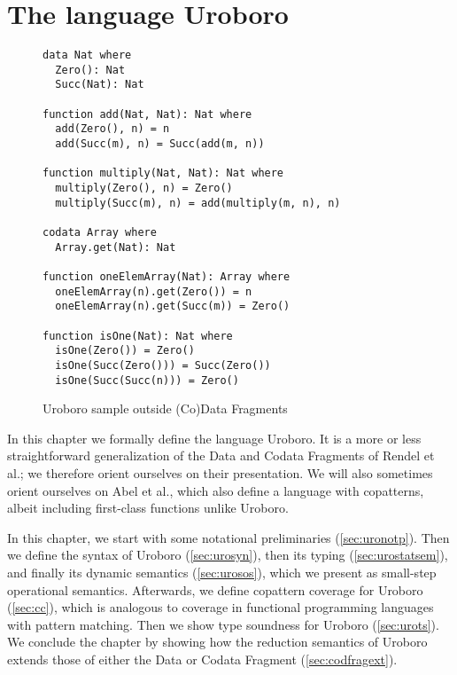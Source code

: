 \chapter{The language Uroboro}
\label{ch:uro}

\begin{figure}
\begin{lstlisting}
data Nat where
  Zero(): Nat
  Succ(Nat): Nat

function add(Nat, Nat): Nat where
  add(Zero(), n) = n
  add(Succ(m), n) = Succ(add(m, n))

function multiply(Nat, Nat): Nat where
  multiply(Zero(), n) = Zero()
  multiply(Succ(m), n) = add(multiply(m, n), n)

codata Array where
  Array.get(Nat): Nat

function oneElemArray(Nat): Array where
  oneElemArray(n).get(Zero()) = n
  oneElemArray(n).get(Succ(m)) = Zero()

function isOne(Nat): Nat where
  isOne(Zero()) = Zero()
  isOne(Succ(Zero())) = Succ(Zero())
  isOne(Succ(Succ(n))) = Zero()
\end{lstlisting}
\caption{Uroboro sample outside (Co)Data Fragments}
\label{fig:ch2uroex}
\end{figure}

In this chapter we formally define the language Uroboro. It is a more or less straightforward generalization of the Data and Codata Fragments of Rendel et al.\cite{rendel15automatic}; we therefore orient ourselves on their presentation. We will also sometimes orient ourselves on Abel et al.\cite{abel13copatterns}, which also define a language with copatterns, albeit including first-class functions unlike Uroboro.

In this chapter, we start with some notational preliminaries (\autoref{sec:uronotp}). Then we define the syntax of Uroboro (\autoref{sec:urosyn}), then its typing (\autoref{sec:urostatsem}), and finally its dynamic semantics (\autoref{sec:urosos}), which we present as small-step operational semantics. Afterwards, we define copattern coverage for Uroboro (\autoref{sec:cc}), which is analogous to coverage in functional programming languages with pattern matching. Then we show type soundness for Uroboro (\autoref{sec:urots}). We conclude the chapter by showing how the reduction semantics of Uroboro extends those of either the Data or Codata Fragment (\autoref{sec:codfragext}).

